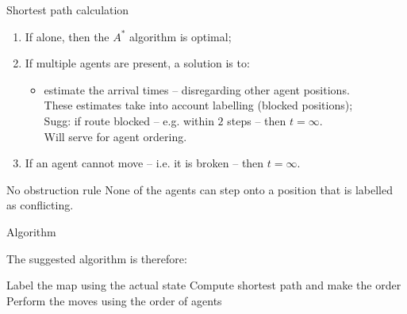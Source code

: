 \documentclass[aspectratio=169,12pt]{beamer}
\begin{document}
\begin{frame}{Shortest path calculation}

\begin{enumerate}
\item If alone, then the $A^*$ algorithm is optimal;
\vfill
\item If multiple agents are present, a solution is to:
  \begin{itemize}
  \item estimate the arrival times -- disregarding \alert{other agent positions}.\\
  \hfill These estimates take into account labelling (blocked positions);\\
  \hfill Sugg: if route blocked -- e.g. within $2$ steps -- then $t=\infty$.\\
  \hfill Will serve for agent ordering.
  \end{itemize}
\vfill
\item If an agent cannot move -- i.e. it is broken -- then $t=\infty$.
\end{enumerate}

\vfill
\vfill

\begin{block}{No obstruction rule}
  None of the agents can step onto a position that is labelled as conflicting.
\end{block}

\end{frame}

\begin{frame}[fragile]{Algorithm}

The suggested algorithm is therefore:

\begin{algorithmic}[1]
\State Label the map using the actual state
\State Compute shortest path and make the order
\State Perform the moves using the order of agents
\State* \qquad{}
\EndWhile
\end{algorithmic}

\end{frame}
\end{document}
